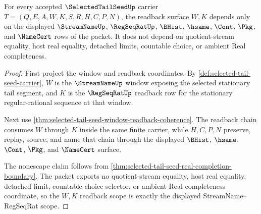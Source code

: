 \begin{theorem}
\label{thm:selected-tail-seed-stream-regular-readback-scope}
For every accepted $\SelectedTailSeedUp$ carrier $T=(Q,E,A,W,K,S,R,H,C,P,N)$, the readback surface $W,K$ depends only on the displayed $\StreamNameUp$, $\RegSeqRatUp$, $\BHist$, $\hsame$, $\Cont$, $\Pkg$, and $\NameCert$ rows of the packet. It does not depend on quotient-stream equality, host real equality, detached limits, countable choice, or ambient Real completeness.
\end{theorem}
\begin{proof}
First project the window and readback coordinates. By \autoref{def:selected-tail-seed-carrier}, $W$ is the $\StreamNameUp$ window exposing the selected stationary tail segment, and $K$ is the $\RegSeqRatUp$ readback row for the stationary regular-rational sequence at that window.

Next use \autoref{thm:selected-tail-seed-window-readback-coherence}. The readback chain consumes $W$ through $K$ inside the same finite carrier, while $H,C,P,N$ preserve, replay, source, and name that chain through the displayed $\BHist$, $\hsame$, $\Cont$, $\Pkg$, and $\NameCert$ surface.

The nonescape claim follows from \autoref{thm:selected-tail-seed-real-completion-boundary}. The packet exports no quotient-stream equality, host real equality, detached limit, countable-choice selector, or ambient Real-completeness coordinate, so the $W,K$ readback scope is exactly the displayed StreamName--RegSeqRat scope.
\end{proof}

